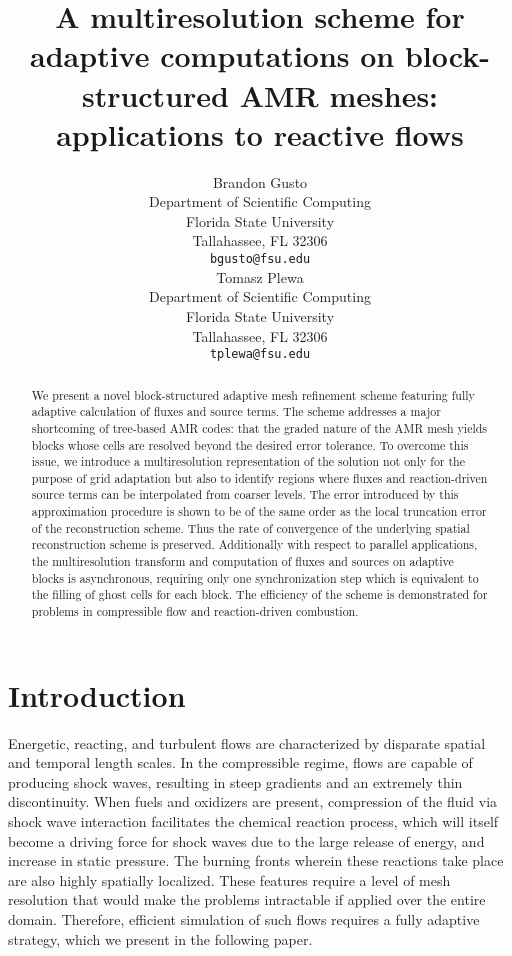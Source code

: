 \documentclass[]{article}
\title{A multiresolution scheme for adaptive computations on block-structured AMR meshes: applications to reactive flows}
\author{
  Brandon Gusto\\
  Department of Scientific Computing\\
  Florida State University\\
  Tallahassee, FL 32306 \\
  \texttt{bgusto@fsu.edu} \\
  \And
  Tomasz Plewa \\
  Department of Scientific Computing\\
  Florida State University\\
  Tallahassee, FL 32306 \\
  \texttt{tplewa@fsu.edu} \\
}
\begin{document}
\maketitle

\begin{abstract}
    We present a novel block-structured adaptive mesh refinement scheme
    featuring fully adaptive calculation of fluxes and source terms. The scheme
    addresses a major shortcoming of tree-based AMR codes: that the graded
    nature of the AMR mesh yields blocks whose cells are resolved beyond the
    desired error tolerance. To overcome this issue, we introduce a
    multiresolution representation of the solution not only for the purpose of
    grid adaptation but also to identify regions where fluxes and
    reaction-driven source terms can be interpolated from coarser levels. The
    error introduced by this approximation procedure is shown to be of the same
    order as the local truncation error of the reconstruction scheme. Thus the
    rate of convergence of the underlying spatial reconstruction scheme is
    preserved.  Additionally with respect to parallel applications, the
    multiresolution transform and computation of fluxes and sources on adaptive
    blocks is asynchronous, requiring only one synchronization step which is
    equivalent to the filling of ghost cells for each block. The efficiency of
    the scheme is demonstrated for problems in compressible flow and
    reaction-driven combustion.
\end{abstract}


\section{Introduction}

    Energetic, reacting, and turbulent flows are characterized by disparate
    spatial and temporal length scales. In the compressible regime, flows are
    capable of producing shock waves, resulting in steep gradients and an
    extremely thin discontinuity. When fuels and oxidizers are present,
    compression of the fluid via shock wave interaction facilitates the
    chemical reaction process, which will itself become a driving force for
    shock waves due to the large release of energy, and increase in static
    pressure. The burning fronts wherein these reactions take place are also
    highly spatially localized.  These features require a level of mesh
    resolution that would make the problems intractable if applied over the
    entire domain. Therefore, efficient simulation of such flows requires a
    fully adaptive strategy, which we present in the following paper.
\end{document}
